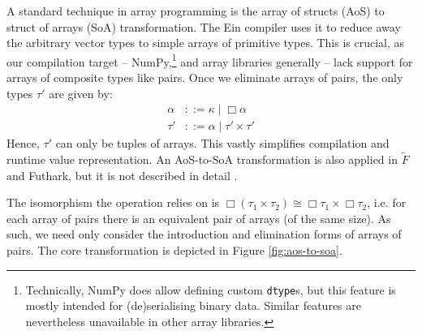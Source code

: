 A standard technique in array programming is the array of structs (AoS) to struct of arrays (SoA) transformation. The Ein compiler uses it to reduce away the arbitrary vector types to simple arrays of primitive types. This is crucial, as our compilation target -- NumPy,\footnote{Technically, NumPy does allow defining custom \texttt{dtype}s, but this feature is mostly intended for (de)serialising binary data. Similar features are nevertheless unavailable in other array libraries.} and array libraries generally -- lack support for arrays of composite types like pairs. Once we eliminate arrays of pairs, the only types $\tau'$ are given by:
\begin{align*}
\alpha &::= \kappa \mid \Box \alpha \\
\tau' &::= \alpha \mid \tau' \times \tau'
\end{align*}
Hence, $\tau'$ can only be tuples of arrays. This vastly simplifies compilation and runtime value representation. An AoS-to-SoA transformation is also applied in $\tilde F$ and Futhark, but it is not described in detail \cite{henriksen2017futhark, shaikhha2019efficient}. 

The isomorphism the operation relies on is $\Box (\tau_1 \times \tau_2) \cong \Box \tau_1 \times \Box \tau_2$, i.e. for each array of pairs there is an equivalent pair of arrays (of the same size). As such, we need only consider the introduction and elimination forms of arrays of pairs. The core transformation is depicted in Figure \ref{fig:aos-to-soa}.

\newcommand{\phisoa}[1]{\mathcal S \left\llbracket {#1} \right\rrbracket}
\newcommand{\phitupleindex}[2]{\mathcal P \left\llbracket {#1}, {#2} \right\rrbracket}

